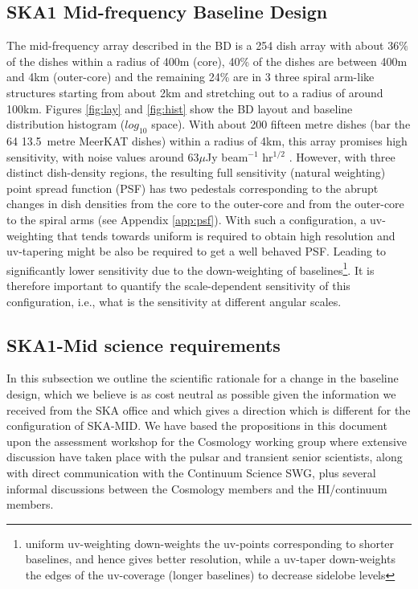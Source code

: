 \documentclass[sfheadings,a4paper,times,9pt,floats,floatfix]{article}
\begin{document}
\subsection{SKA1 Mid-frequency Baseline Design}\label{sec:BL}
The mid-frequency array described in the BD is a 254 dish array with about $36\%$ of the dishes within a radius of 400m (core),
40\% of the dishes are between 400m and 4km (outer-core) and the remaining 24\% are in 3 three spiral arm-like structures starting
from about 2km and stretching out to a radius of around 100km. Figures \ref{fig:lay} and \ref{fig:hist} show the BD layout and
baseline distribution histogram ($log_{10}$ space). With about 200 fifteen metre dishes (bar the 64 13.5~metre MeerKAT dishes)
within a radius of 4km, this array promises high sensitivity, with noise values around 63$\mu$Jy beam$^{-1}$ hr$^{1/2}$ \cite{bd}.
However, with three distinct dish-density regions, the resulting full sensitivity (natural weighting) point spread function (PSF)
has two pedestals corresponding to the abrupt changes in dish densities from the core to the outer-core and from the outer-core to
the spiral arms (see Appendix \ref{app:psf}). With such a configuration, a uv-weighting that tends towards uniform is required to
obtain high resolution and uv-tapering might be also be required to get a well behaved PSF. Leading to significantly lower
sensitivity due to the down-weighting of baselines\footnote{uniform uv-weighting down-weights the uv-points corresponding to
shorter baselines, and hence gives better resolution, while a uv-taper down-weights the edges of the uv-coverage (longer
baselines) to decrease sidelobe levels}. It is therefore important to quantify the scale-dependent sensitivity of this
configuration, i.e., what is the sensitivity at different angular scales.
\subsection{SKA1-Mid science requirements}\label{sec:sci-req}

In this subsection we outline the scientific rationale for a change in
the baseline design,
which we believe is as cost neutral as possible given the information we received from the
SKA office and which gives a direction which is different for the configuration of SKA-MID.
We have based the propositions in this document upon the assessment workshop for the
Cosmology working group where extensive discussion have taken place with the pulsar and
transient senior scientists, along with direct communication with the
Continuum Science SWG, plus several informal discussions between the Cosmology
members and the HI/continuum members.
\end{document}
